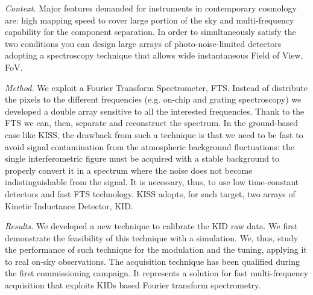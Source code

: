 \color{black}

\emph{Context.} Major features demanded for instruments in contemporary cosmology are: high mapping speed to cover large portion of the sky and multi-frequency capability for the component separation. In order to simultaneously satisfy the two conditions you can design large arrays of photo-noise-limited detectors adopting a spectroscopy technique that allows wide instantaneous Field of View, FoV. 

\emph{Method.} We exploit a Fourier Transform Spectrometer, FTS. Instead of distribute the pixels to the different frequencies (e.g. on-chip and grating spectroscopy) we developed a double array sensitive to all the interested frequencies. Thank to the FTS we can, then, separate and reconstruct the spectrum. In the ground-based case like KISS, the drawback from such a technique is that we need to be fast to avoid signal contamination from the atmospheric background fluctuations: the single interferometric figure must be acquired with a stable background to properly convert it in a spectrum where the noise does not become indistinguishable from the signal. It is necessary, thus, to use low time-constant detectors and fast FTS technology. KISS adopts, for such target, two arrays of Kinetic Inductance Detector, KID.

\emph{Results.} We developed a new technique to calibrate the KID raw data. We first demonstrate the feasibility of this technique with a simulation. We, thus, study the performance of such technique for the modulation and the tuning, applying it to real on-sky observations. The acquisition technique has been qualified during the first commissioning campaign. It represents a solution for fast multi-frequency acquisition that exploits KIDs based Fourier transform spectrometry.